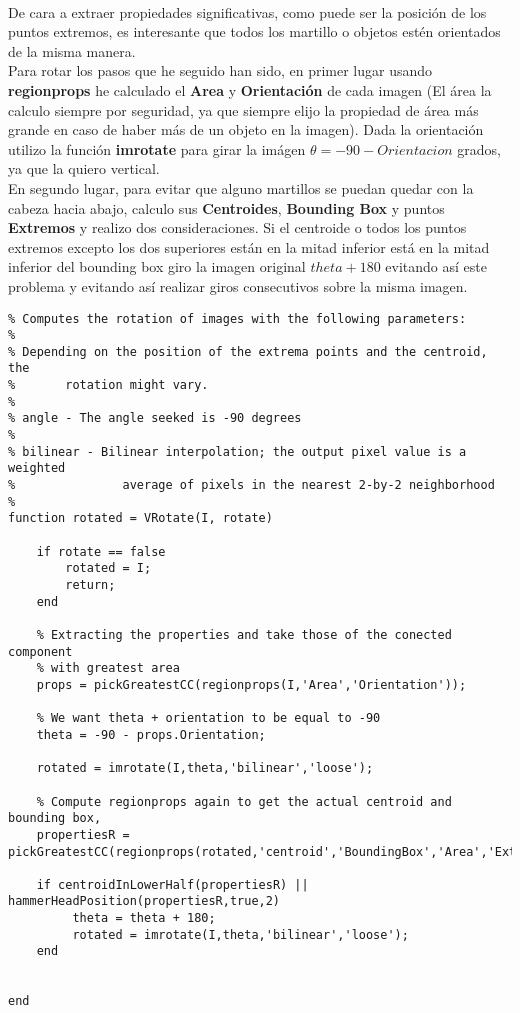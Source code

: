 \documentclass[es,gi]{ifirak}\usepackage[]{graphicx}\usepackage[]{color}
\begin{document}
\paragraph{}
De cara a extraer propiedades significativas, como puede ser la posición de los puntos extremos, es interesante que todos los martillo o objetos estén orientados de la misma manera.\\

Para rotar los pasos que he seguido han sido, en primer lugar usando \textbf{regionprops} he calculado el \textbf{Area} y \textbf{Orientación} de cada imagen (El área la calculo siempre por seguridad, ya que siempre elijo la propiedad de área más grande en caso de haber más de un objeto en la imagen). Dada la orientación utilizo la función \textbf{imrotate} para girar la imágen $\theta = -90 -Orientacion$ grados, ya que la quiero vertical.\\

En segundo lugar, para evitar que alguno martillos se puedan quedar con la cabeza hacia abajo, calculo sus \textbf{Centroides}, \textbf{Bounding Box} y puntos \textbf{Extremos} y realizo dos consideraciones. Si el centroide o todos los puntos extremos excepto los dos superiores están en la mitad inferior está en la mitad inferior del bounding box giro la imagen original $theta + 180$ evitando así este problema y evitando así realizar giros consecutivos sobre la misma imagen.\\

\begin{lstlisting}
% Computes the rotation of images with the following parameters:
%
% Depending on the position of the extrema points and the centroid, the 
%       rotation might vary.
% 
% angle - The angle seeked is -90 degrees
%
% bilinear - Bilinear interpolation; the output pixel value is a weighted 
%               average of pixels in the nearest 2-by-2 neighborhood
%
function rotated = VRotate(I, rotate)

    if rotate == false 
        rotated = I;
        return;
    end
    
    % Extracting the properties and take those of the conected component
    % with greatest area
    props = pickGreatestCC(regionprops(I,'Area','Orientation'));

    % We want theta + orientation to be equal to -90
    theta = -90 - props.Orientation;
    
    rotated = imrotate(I,theta,'bilinear','loose');
    
    % Compute regionprops again to get the actual centroid and bounding box, 
    propertiesR = pickGreatestCC(regionprops(rotated,'centroid','BoundingBox','Area','Extrema'));
        
    if centroidInLowerHalf(propertiesR) || hammerHeadPosition(propertiesR,true,2)
         theta = theta + 180;
         rotated = imrotate(I,theta,'bilinear','loose');
    end
    
    
end


\end{lstlisting}
\end{document}
